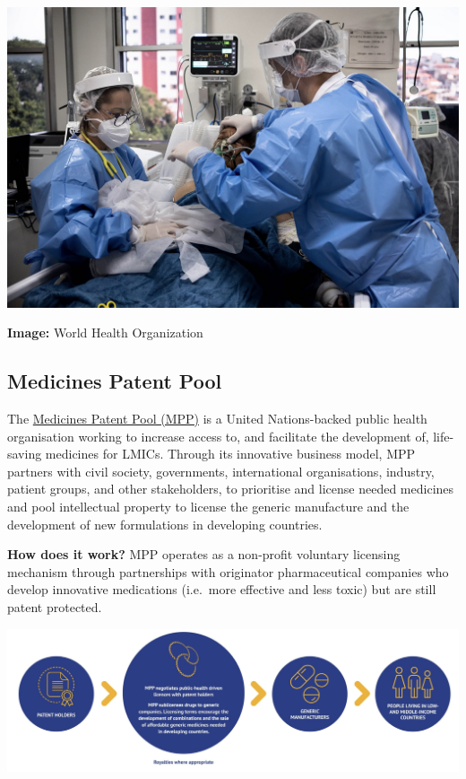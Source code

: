\documentclass[
  11pt,
  paper=a4,
  ,captions=tableheading
]{scrartcl}
\begin{document}
\includegraphics[width=6.25in,height=\textheight]{images/COVID.png}

\textbf{Image:} World Health Organization

\hypertarget{medicines-patent-pool}{%
\subsection*{Medicines Patent Pool}\label{medicines-patent-pool}}

The \href{https://medicinespatentpool.org/}{Medicines Patent Pool (MPP)}
is a United Nations-backed public health organisation working to
increase access to, and facilitate the development of, life-saving
medicines for LMICs. Through its innovative business model, MPP partners
with civil society, governments, international organisations, industry,
patient groups, and other stakeholders, to prioritise and license needed
medicines and pool intellectual property to license the generic
manufacture and the development of new formulations in developing
countries.

\textbf{How does it work?} MPP operates as a non-profit voluntary
licensing mechanism through partnerships with originator pharmaceutical
companies who develop innovative medications (i.e.~more effective and
less toxic) but are still patent protected.

\includegraphics[width=6.25in,height=\textheight]{images/mpp_1.png}
\end{document}
